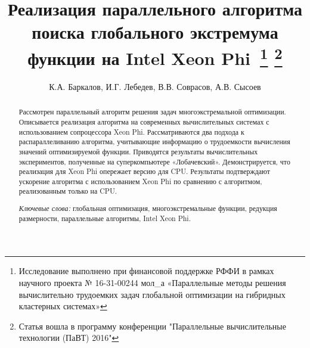 \documentclass[a4paper]{article}
\begin{document}
\title{Реализация параллельного алгоритма поиска глобального экстремума функции на Intel Xeon Phi\
\footnote{
Исследование выполнено при финансовой поддержке РФФИ в рамках научного проекта № 16-31-00244 мол\_а «Параллельные методы решения вычислительно трудоемких задач глобальной оптимизации на гибридных кластерных системах»}
\footnote{
Статья вошла в программу конференции "Параллельные вычислительные технологии (ПаВТ) 2016"}}
\author{К.А. Баркалов, И.Г. Лебедев, В.В. Соврасов, А.В. Сысоев}
\date{}
\maketitle
\thispagestyle{firststyle}
\begin{abstract}
Рассмотрен параллельный алгоритм решения задач многоэкстремальной оптимизации. Описывается реализация алгоритма на современных вычислительных системах с использованием сопроцессора Xeon Phi. Рассматриваются два подхода к распараллеливанию алгоритма, учитывающие информацию о трудоемкости вычисления значений оптимизируемой функции. Приводятся результаты вычислительных экспериментов, полученные на суперкомпьютере «Лобачевский». Демонстрируется, что реализация для Xeon Phi опережает версию для CPU. Результаты подтверждают ускорение алгоритма с использованием Xeon Phi по сравнению с алгоритмом, реализованным только на CPU.
\par
\textit{Ключевые слова:} глобальная оптимизация, многоэкстремальные функции, редукция размерности, параллельные алгоритмы, Intel Xeon Phi.
\end{abstract}









\end{document}
